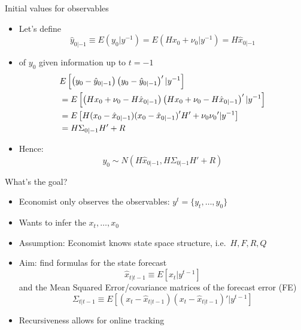 \documentclass[handout,usepdftitle=false,xcolor=dvipsnames,aspectratio=169]{beamer}
\begin{document}
\begin{frame}{Initial values for observables}

  \begin{itemize}
    \item Let's define
          \begin{equation}
            \hat y_{0|-1} \equiv E({y_0}|y^{-1}) =E( H{x_0} + {\nu _0}|y^{-1})=H\hat x_{0|-1}
          \end{equation}
    \item {} of ${y_0}$ given information up to $t=-1$
          \begin{align}
             & E\left[\left( y_0 - \hat y_{0|-1} \right)\left( y_0 - \hat y_{0|-1} \right)'|y^{-1}\right]\notag   \\& = E\left[\left( {H{x_0} + {\nu _0}-H\hat x_{0|-1}} \right)\left( {H{x_0} + {\nu _0}-H\hat x_{0|-1}} \right)'|y^{-1}\right] \notag\\
             & =  E\left[ {H{(x_0-\hat x_{0|-1})}{(x_0-\hat x_{0|-1})}'H' + {\nu_0}{\nu_0}'}|y^{-1}\right] \notag \\
             & = H{\Sigma _{0|-1}}H' + R
          \end{align}
    \item  Hence:
          \begin{equation}
            {y_0} \sim N\left( {H{{\hat x}_{0|-1}},H{\Sigma _{0|-1}}H' + R} \right)
          \end{equation}

  \end{itemize}
\end{frame}

\begin{frame}{What's the goal?}

  \begin{itemize}
    \item Economist only observes the observables: $y^t=\{y_t,\ldots,y_0\}$\vspace{0.2cm}
    \item Wants to infer the  $x_t,\ldots,x_0$\vspace{0.2cm}
    \item Assumption: Economist knows state space structure, i.e.\ $H,F,R,Q$\vspace{0.2cm}
    \item Aim: find  formulas for the state forecast
          \begin{equation}
            \hat x_{t|t-1}\equiv E[x_t|y^{t-1}]
          \end{equation}
          and the Mean Squared Error/covariance matrices of the forecast error (FE)
          \begin{equation}
            \Sigma _{t|t-1} \equiv E\left[ \left( x_t - {\hat x}_{t|t-1} \right)\left( x_t - {\hat x}_{t|t-1} \right)'|y^{t - 1} \right]
          \end{equation}
    \item Recursiveness allows for online tracking

  \end{itemize}
\end{frame}
\end{document}
